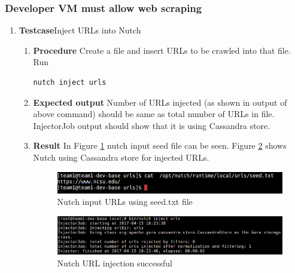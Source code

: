 \subsubsection{Developer VM must allow web scraping}
\begin{enumerate}
\item \textbf{Testcase}\newline Inject URLs into Nutch
  \begin{enumerate}[label={}]
  \item \textbf{Procedure}\newline
    Create a file  and
    insert URLs to be crawled into that file. Run
    \begin{lstlisting}[style=Bash]
      nutch inject urls
    \end{lstlisting}
  \item \textbf{Expected output}\newline
    Number of URLs injected (as shown in output of above command)
    should be same as total number of URLs in 
    file. InjectorJob output should show that it is using Cassandra store.
  \item \textbf{Result}\newline
    In Figure \ref{nutch-seedfile} nutch input seed file can be
    seen. Figure \ref{nutch-inject} shows Nutch using Cassandra store
    for injected URLs.
    \begin{figure}
      \centering
      \includegraphics[scale=0.4]{screenshots/nutch-seedfile.png}
      \caption{Nutch input URLs using seed.txt file}
      \label{nutch-seedfile}
    \end{figure}

    \begin{figure}
      \centering
      \includegraphics[scale=0.4]{screenshots/nutch-inject.png}
      \caption{Nutch URL injection successful}
      \label{nutch-inject}
    \end{figure}
  \end{enumerate}



\end{enumerate}
